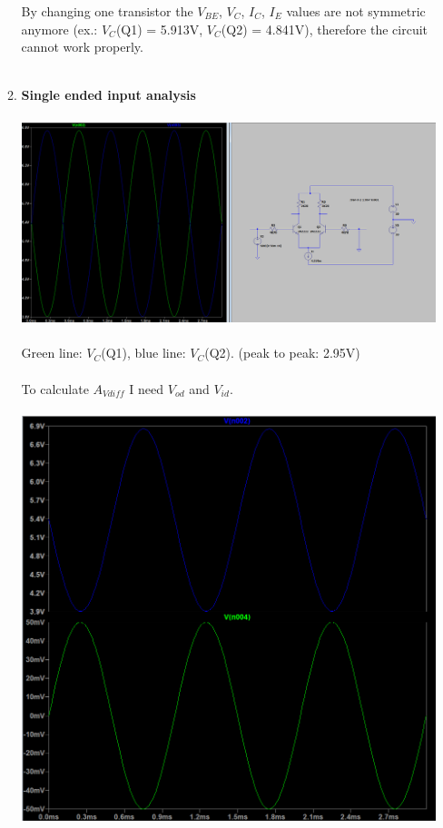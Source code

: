 \documentclass{article}
\begin{document}
\begin{enumerate}
\begin{enumerate}
			By changing one transistor the \(V_{BE}\), \(V_C\), \(I_C\), \(I_E\) values are not symmetric anymore (ex.: \(V_C\)(Q1) = 5.913V, \(V_C\)(Q2) = 4.841V), therefore the circuit cannot work properly.\\\\
			\pagebreak
			\item \textbf{Single ended input analysis}\\\\
			\includegraphics[scale=0.4]{prelab 4/circuit 6 - coll voltages}\\\\
			Green line: \(V_C\)(Q1), blue line: \(V_C\)(Q2). (peak to peak: 2.95V)\\\\
			To calculate \(A_{Vdiff}\) I need \(V_{od}\) and \(V_{id}\).\\\\
			\includegraphics[scale=0.6]{prelab 4/circuit 6 - avdiff}\\\\

\end{enumerate}
\end{enumerate}
\end{document}
